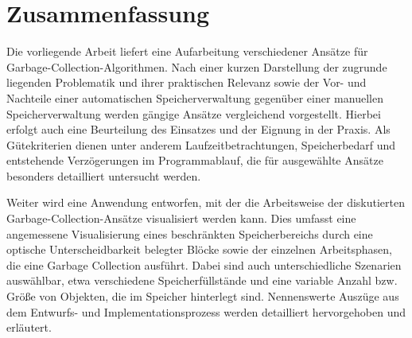 %
\chapter*{Zusammenfassung}
\label{sec:abstract}
\vspace*{-10mm}

Die vorliegende Arbeit liefert eine Aufarbeitung verschiedener Ansätze für Garbage-Collection-Algorithmen.
Nach einer kurzen Darstellung der zugrunde liegenden Problematik und ihrer praktischen Relevanz sowie der Vor- und Nachteile einer automatischen Speicherverwaltung gegenüber einer manuellen Speicherverwaltung werden gängige Ansätze vergleichend vorgestellt.
Hierbei erfolgt auch eine Beurteilung des Einsatzes und der Eignung in der Praxis.
Als Gütekriterien dienen unter anderem Laufzeitbetrachtungen, Speicherbedarf und entstehende Verzögerungen im Programmablauf, die für ausgewählte Ansätze besonders detailliert untersucht werden.

Weiter wird eine Anwendung entworfen, mit der die Arbeitsweise der diskutierten Garbage-Collection-Ansätze visualisiert werden kann.
Dies umfasst eine angemessene Visualisierung eines beschränkten Speicherbereichs durch eine optische Unterscheidbarkeit belegter Blöcke sowie der einzelnen Arbeitsphasen, die eine Garbage Collection ausführt.
Dabei sind auch unterschiedliche Szenarien auswählbar, etwa verschiedene Speicherfüllstände und eine variable Anzahl bzw. Größe von Objekten, die im Speicher hinterlegt sind.
Nennenswerte Auszüge aus dem Entwurfs- und Implementationsprozess werden detailliert hervorgehoben und erläutert.